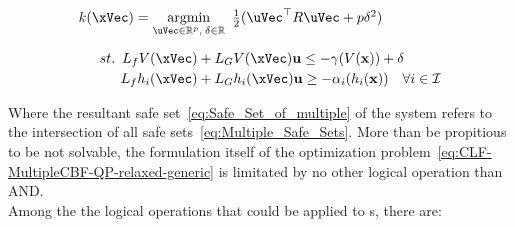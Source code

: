 \begin{equation}
    \begin{array}{l}
        k(\xVec) = \underset{\uVec \in \mathbb{R}^p, \hspace{0.2em} \delta \in \mathbb{R}}{\mathrm{argmin}} \quad \hspace{-0.5em} \frac{1}{2} (\uVec^\top R \uVec + p\delta^2 ) \vspace{1em} \\ 
        \quad \hspace{0.5em}  st. \hspace{0.5em} L_fV(\xVec) + L_GV(\xVec)\mathbf{u} \leq -\gamma(V(\mathbf{x})) + \delta \vspace{0.25em}\\
        \quad \quad \hspace{1em}                 L_fh_i(\xVec) + L_Gh_i(\xVec)\mathbf{u} \geq -\alpha_i(h_i(\mathbf{x}))  \quad \forall i \in \mathcal{I}    
    \end{array}
 \label{eq:CLF-MultipleCBF-QP-relaxed-generic}
\end{equation}

Where the resultant safe set~\eqref{eq:Safe_Set_of_multiple} of the system refers to the intersection of all safe sets~\eqref{eq:Multiple_Safe_Sets}. More than be propitious to be not solvable, the formulation itself of the optimization problem~\eqref{eq:CLF-MultipleCBF-QP-relaxed-generic} is limitated by no other logical operation than AND. \\

Among the the logical operations that could be applied to s, there are:


